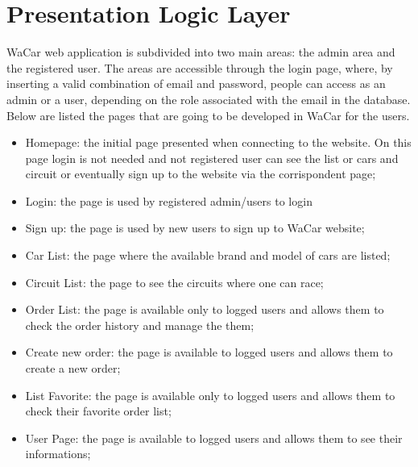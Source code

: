 \section{Presentation Logic Layer}


WaCar web application is subdivided into two main areas: the admin area and the registered user. The areas are accessible through the login page, where, by inserting a valid combination of email and password, people can access as an admin or a user, depending on the role associated with the email in the database. Below are listed the pages that are going to be developed in WaCar for the users.
\begin{itemize}
    \item Homepage: the initial page presented when connecting to the website. On this page login is not needed and not registered user can see the list or cars and circuit or eventually sign up to the website via the corrispondent page;
    \item Login: the page is used by registered admin/users to login
    \item Sign up: the page is used by new users to sign up to WaCar website;
    \item Car List: the page where the available brand and model of cars are listed;
    \item Circuit List: the page to see the circuits where one can race;
    \item Order List: the page is available only to logged users and allows them to check the order history and manage the them;
    \item Create new order: the page is available to logged users and allows them to create a new order;
    \item List Favorite: the page is available only to logged users and allows them to check their favorite order list;
    \item User Page: the page is available to logged users and allows them to see their informations;\\
\end{itemize}


